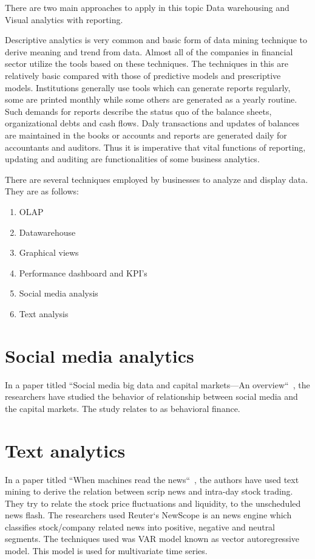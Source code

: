 There are two main approaches to apply in this topic Data warehousing and Visual analytics with reporting.

Descriptive analytics is very common and basic form of data mining technique to derive meaning and trend from data. Almost all of the companies in financial sector utilize the tools based on these techniques. The techniques in this are relatively basic compared with those of predictive models and prescriptive models. Institutions generally use tools which can generate reports regularly, some are printed monthly while some others are generated  as a yearly routine. Such demands for reports describe the status quo of the balance sheets, organizational debts and cash flows. Daly transactions and updates of balances are maintained in the books or accounts and reports are generated daily for accountants and auditors. Thus it is imperative that vital functions of reporting, updating and auditing are functionalities of some business analytics.

There are several techniques employed by businesses to analyze and display data. They are as follows:
\begin{enumerate}
	\item OLAP
	\item Datawarehouse
	\item Graphical views
	\item Performance dashboard and KPI's
	\item Social media analysis
	\item Text analysis
\end{enumerate}

\section{Social media analytics}
In a paper titled ``Social media big data and capital markets—An overview``~, the researchers have studied the behavior of relationship between social media and the capital markets. The study relates to as behavioral finance. 

\section{Text analytics}
In a paper titled ``When machines read the news``~, the authors have used text mining to derive the relation between scrip news and intra-day stock trading. They try to relate the stock price fluctuations and liquidity, to the unscheduled news flash. The researchers used Reuter`s NewScope is an news engine which classifies stock/company related news into positive, negative and neutral segments. The techniques used was VAR model known as vector autoregressive model. This model is used for multivariate time series. 


